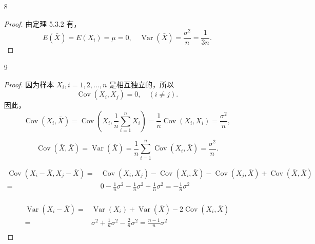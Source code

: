 \documentclass[normal,founder,mtpro2,cn]{elegantnote}
\begin{document}
\begin{enumerate}
        \item[8] 
        \begin{proof}
            由定理 5.3.2 有，
            \begin{equation*}
                E(\bar{X})=E(X_i)=\mu=0,\quad \operatorname{Var}(\bar{X})=\frac{\sigma^2}{n}=\frac{1}{3n}.
            \end{equation*}
        \end{proof}
    
        \item[9] 
        \begin{proof}
            因为样本 $X_{i},i=1,2,\ldots,n$ 是相互独立的，所以
            \begin{equation*}
                \operatorname{Cov}\left(X_{i},X_{j}\right)=0,\quad(i\neq j).
            \end{equation*}
            因此，
            \begin{equation*}
                \operatorname{Cov}\left(X_{i},\bar{X}\right)=\operatorname{Cov}\left(X_{i},\frac{1}{n}
                \sum_{i=1}^nX_{i}\right)=\frac{1}{n}\operatorname{Cov}\left(X_{i},X_{i}\right)=\frac{\sigma^2}{n},
            \end{equation*}

            \begin{equation*}
                \operatorname{Cov}(\bar{X}, \bar{X})=\operatorname{Var}\left(\bar{X}\right)=\frac{1}{n}\sum_{i=1}^{n}\operatorname{Cov}\left(X_{i},\bar{X}\right)=\frac{\sigma^2}{n}.
            \end{equation*}

            \begin{equation*}
                \begin{aligned}
                    \operatorname{Cov}\left(X_{i}-\bar{X}, X_{j}-\bar{X}\right)=&\operatorname{Cov}\left(X_{i}, X_{j}\right)-\operatorname{Cov}\left(X_{i}, \bar{X}\right)-\operatorname{Cov}\left(X_{j},\bar{X}\right)+\operatorname{Cov}(\bar{X}, \bar{X}) \\
                    =&0-\frac{1}{n}\sigma^{2}-\frac{1}{n}\sigma^{2}+\frac{1}{n}\sigma^{2}=-\frac{1}{n}\sigma^{2} \\
                \end{aligned}
            \end{equation*}
    
            \begin{equation*}
                \begin{aligned}
                    \operatorname{Var}\left(X_{i}-\bar{X}\right)=&\operatorname{Var}\left(X_{i}\right)+\operatorname{Var}(\bar{X})-2 \operatorname{Cov}\left(X_{i}, \bar{X}\right) \\
                    =&\sigma^{2}+\frac{1}{n} \sigma^{2}-\frac{2}{n} \sigma^{2}=\frac{n-1}{n} \sigma^{2} \\
                \end{aligned}
            \end{equation*}
    

\end{proof}
\end{enumerate}
\end{document}
